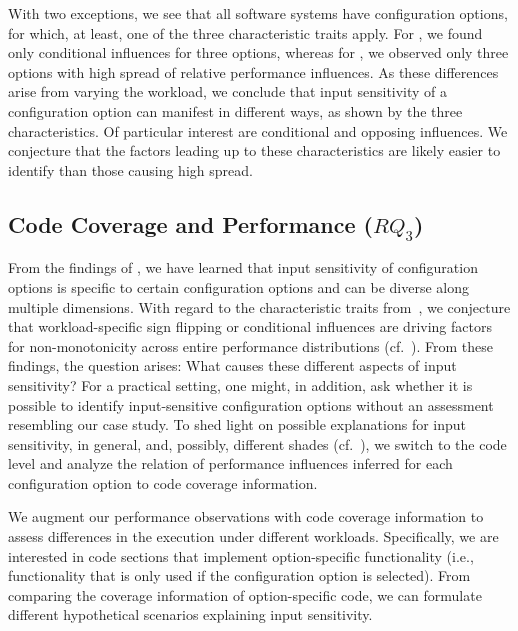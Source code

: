 {With two exceptions, we see that all software systems have configuration options, for which, at least, one of the three characteristic traits apply. For \jumper, we found only conditional influences for three options, whereas for \jadx, we observed only three options with high spread of relative performance influences. As these differences arise from varying the workload, we conclude that input sensitivity of a configuration option can manifest in different ways, as shown by the three characteristics. Of particular interest are conditional and opposing influences. We conjecture that the factors leading up to these characteristics are likely easier to identify than those causing high spread.
\vspace{1mm}

\subsection{Code Coverage and Performance ($RQ_3$)}\label{sec:rq3}\label{sec:categories}
From the findings of , we have learned that input sensitivity of configuration options is specific to certain configuration options and can be diverse along multiple dimensions. With regard to the characteristic traits from~, we conjecture that workload-specific sign flipping or conditional influences are driving factors for non-monotonicity across entire performance distributions (cf.~). From these findings, the question arises: What causes these different aspects of input sensitivity? For a practical setting, one might, in addition, ask whether it is possible to identify input-sensitive configuration options without an assessment resembling our case study.
To shed light on possible explanations for input sensitivity, in general, and, possibly, different shades (cf.~), we switch to the code level and analyze the relation of performance influences inferred for each configuration option to code coverage information. 

We augment our performance observations with code coverage information to assess differences in the execution under different workloads. Specifically, we are interested in code sections that implement option-specific functionality (i.e., functionality that is only used if the configuration option is selected). From comparing the coverage information of option-specific code, we can formulate different hypothetical scenarios explaining input sensitivity. 

}

